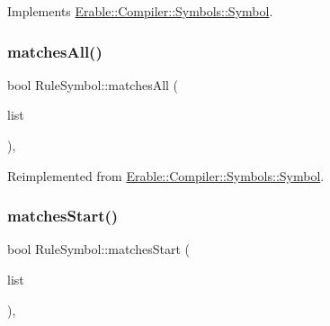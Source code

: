 Implements \mbox{\hyperlink{class_erable_1_1_compiler_1_1_symbols_1_1_symbol_a781d595ec8d14efcdbbf6d6123af1f50}{Erable\+::\+Compiler\+::\+Symbols\+::\+Symbol}}.

\mbox{\label{class_erable_1_1_compiler_1_1_symbols_1_1_rule_symbol_a690e797889b403487385955dc3fe7501}} 
\subsubsection{\texorpdfstring{matchesAll()}{matchesAll()}}
{\footnotesize\ttfamily bool Rule\+Symbol\+::matches\+All (\begin{DoxyParamCaption}\item[{Data\+::\+Data\+Deque}]{list }\end{DoxyParamCaption})\hspace{0.3cm}{\ttfamily [override]}, {\ttfamily [virtual]}}



Reimplemented from \mbox{\hyperlink{class_erable_1_1_compiler_1_1_symbols_1_1_symbol_a49dd91010baf238ed0d639004c3ec9ba}{Erable\+::\+Compiler\+::\+Symbols\+::\+Symbol}}.

\mbox{\label{class_erable_1_1_compiler_1_1_symbols_1_1_rule_symbol_a965c2e3ba84c2e93c5ebbce5003b721b}} 
\subsubsection{\texorpdfstring{matchesStart()}{matchesStart()}}
{\footnotesize\ttfamily bool Rule\+Symbol\+::matches\+Start (\begin{DoxyParamCaption}\item[{Data\+::\+Data\+Deque}]{list }\end{DoxyParamCaption})\hspace{0.3cm}{\ttfamily [override]}, {\ttfamily [virtual]}}



